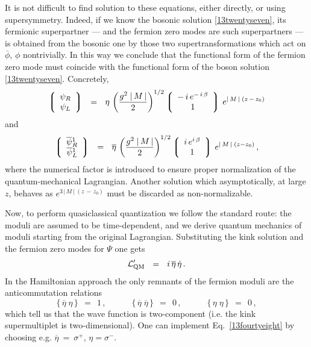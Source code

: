 \documentclass[epsfig,12pt]{article}
\def\beq{\begin{equation}}
\def\eeq{\end{equation}}
\def\beq{\begin{equation}}
\def\eeq{\end{equation}}
\newcommand{\ov}{\overline}
\newcommand{\lgr}{\left\lgroup}
\newcommand{\rgr}{\right\rgroup}
\newcommand{\bpsi}{\ov{\psi}{}}
\newcommand{\bphi}{\ov{\phi}{}}
\begin{document}
	It is not difficult to find solution to these 
	equations, either directly, or using supersymmetry.
	Indeed, if we know the bosonic solution \eqref{13twentyseven},
	its fermionic superpartner --- and the fermion zero modes are such 
	superpartners --- is obtained from the
	bosonic one by those two supertransformations which act on
	$ \bphi $, $ \phi $ nontrivially.
	In this way we conclude that the
	functional form of the fermion zero mode 
	must coincide  with the functional form of the boson  
	solution \eqref{13twentyseven}. 
	Concretely,
\beq
	\lgr
		\begin{array}{c}
			\psi_R  \\  
			\psi_L
		\end{array}
	\rgr  ~~=~~ 
	\eta \,
	\left( \frac{g^2\; |\, M\,|}{2} \right)^{1/2}
	\lgr 
		\begin{array}{c}
			-\,i\,e^{-\,i\,\beta}  \\
			1
		\end{array}
	\rgr  \,e^{|\, M \,|\; (z \,-\, z_0)}
\label{13fourtyfive}
\eeq
	and
 \beq
	\lgr
		\begin{array}{c}
			\bpsi_R^1  \\
			\bpsi_L^1
		\end{array}
	\rgr  ~~=~~  
	\ov{\eta}\, \left( \frac{g^2\; |\, M \,|}{2} \right)^{1/2} 
	\lgr
		\begin{array}{c}
			i\, e^{i\, \beta}  \\
			1
		\end{array}
	\rgr  \,e^{|\, M \,|\; (z-z_0)}\,,
\label{13fourtysix}
\eeq
	where the numerical factor is introduced to ensure proper
	normalization of the quantum-mechanical Lagrangian.
	Another solution which asymptotically, at large $z$, behaves
	as $ e^{3\, |\, M \,|\; (z \,-\, z_0)}$ must be discarded as non-normalizable.

	Now, to
	perform   quasiclassical quantization we follow the standard route:
	the moduli are assumed to be   time-dependent, and we derive 
	quantum mechanics of moduli starting from the original Lagrangian.
	Substituting the kink solution and the fermion zero modes for
	$\Psi$ one gets
\beq
	{\cal L}'_{\rm QM}  ~~=~~ i\, \ov{\eta}\, \dot\eta\,.
\label{13fourtyseven}
\eeq
	In the Hamiltonian approach the only remnants of the fermion moduli
	are the anticommutation relations
\beq
	\{\, \ov{\eta}\; \eta \,\}  ~~=~~  1\,,\qquad\quad
	\{\, \ov{\eta}\; \ov{\eta} \,\}  ~~=~~  0\,,\qquad\quad 
	\{\, \eta\; \eta \,\}  ~~=~~  0\,,
\label{13fourtyeight}
\eeq
	which tell us that the wave function is two-component
	(i.e. the kink supermultiplet is two-dimensional). One can implement
	Eq.~\eqref{13fourtyeight} by choosing e.g. 
	$ \ov{\eta} ~=~ \sigma^+ $, $ \eta=\sigma^- $.
\end{document}
